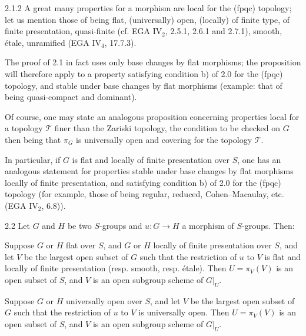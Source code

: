 \begin{remark}{2.1.2}\label{VIB.2.1.2}
A great many properties for a morphism are local for the (fpqc) topology; let us mention those of being flat, (universally) open, (locally) of finite type, of finite presentation, quasi-finite (cf. EGA IV$_2$, 2.5.1, 2.6.1 and 2.7.1), smooth, étale, unramified (EGA IV$_4$, 17.7.3).

The proof of 2.1 in fact uses only base changes by flat morphisms; the proposition will therefore apply to a property satisfying condition b) of 2.0 for the (fpqc) topology, and stable under base changes by flat morphisms (example: that of being quasi-compact and dominant).

Of course, one may state an analogous proposition concerning properties local for a topology $\mathcal T$ finer than the Zariski topology, the condition to be checked on $G$ then being that $\pi_G$ is universally open and covering for the topology $\mathcal T$.

In particular, if $G$ is flat and locally of finite presentation over $S$, one has an analogous statement for properties stable under base changes by flat morphisms locally of finite presentation, and satisfying condition b) of 2.0 for the (fpqc) topology (for example, those of being regular, reduced, Cohen--Macaulay, etc. (EGA IV$_2$, 6.8)).
\end{remark}
\begin{proposition}{2.2}\label{VIB.2.2}
Let $G$ and $H$ be two $S$-groups and $u:G\to H$ a morphism of $S$-groups. Then:
\begin{enumeratei}
\item Suppose $G$ or $H$ flat over $S$, and $G$ or $H$ locally of finite presentation over $S$, and let $V$ be the largest open subset of $G$ such that the restriction of $u$ to $V$ is flat and locally of finite presentation (resp. smooth, resp. étale). Then $U=\pi_V(V)$ is an open subset of $S$, and $V$ is an open subgroup scheme of $G|_U$.
\item Suppose $G$ or $H$ universally open over $S$, and let $V$ be the largest open subset of $G$ such that the restriction of $u$ to $V$ is universally open. Then $U=\pi_V(V)$ is an open subset of $S$, and $V$ is an open subgroup scheme of $G|_U$.
\end{enumeratei}
\end{proposition}
